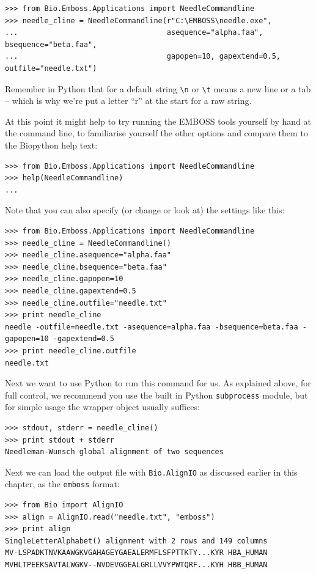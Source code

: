 \documentclass{report}
\begin{document}
\begin{verbatim}
>>> from Bio.Emboss.Applications import NeedleCommandline
>>> needle_cline = NeedleCommandline(r"C:\EMBOSS\needle.exe",
...                                  asequence="alpha.faa", bsequence="beta.faa",
...                                  gapopen=10, gapextend=0.5, outfile="needle.txt")
\end{verbatim}

\noindent Remember in Python that for a default string \verb|\n| or \verb|\t| means a
new line or a tab -- which is why we're put a letter ``r'' at the start for a raw string.

At this point it might help to try running the EMBOSS tools yourself by hand at the
command line, to familiarise yourself the other options and compare them to the
Biopython help text:

\begin{verbatim}
>>> from Bio.Emboss.Applications import NeedleCommandline
>>> help(NeedleCommandline)
...
\end{verbatim}

Note that you can also specify (or change or look at) the settings like this:

\begin{verbatim}
>>> from Bio.Emboss.Applications import NeedleCommandline
>>> needle_cline = NeedleCommandline()
>>> needle_cline.asequence="alpha.faa"
>>> needle_cline.bsequence="beta.faa"
>>> needle_cline.gapopen=10
>>> needle_cline.gapextend=0.5
>>> needle_cline.outfile="needle.txt"
>>> print needle_cline
needle -outfile=needle.txt -asequence=alpha.faa -bsequence=beta.faa -gapopen=10 -gapextend=0.5 
>>> print needle_cline.outfile
needle.txt
\end{verbatim}

Next we want to use Python to run this command for us. As explained above,
for full control, we recommend you use the built in Python \texttt{subprocess}
module, but for simple usage the wrapper object usually suffices:

\begin{verbatim}
>>> stdout, stderr = needle_cline()
>>> print stdout + stderr
Needleman-Wunsch global alignment of two sequences
\end{verbatim}

Next we can load the output file with \verb|Bio.AlignIO| as
discussed earlier in this chapter, as the \texttt{emboss} format:

\begin{verbatim}
>>> from Bio import AlignIO
>>> align = AlignIO.read("needle.txt", "emboss")
>>> print align
SingleLetterAlphabet() alignment with 2 rows and 149 columns
MV-LSPADKTNVKAAWGKVGAHAGEYGAEALERMFLSFPTTKTY...KYR HBA_HUMAN
MVHLTPEEKSAVTALWGKV--NVDEVGGEALGRLLVVYPWTQRF...KYH HBB_HUMAN
\end{verbatim}
\end{document}
